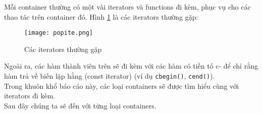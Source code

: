 Mỗi container thường có một vài iterators và functions đi kèm, phục vụ cho các thao tác trên container đó. Hình \ref{popite} là các iterators thường gặp:
\begin{figure}[H]
    \centering
    \texttt{[image: popite.png]}
    \caption{Các iterators thường gặp}
    \label{popite}
\end{figure}
Ngoài ra, các hàm thành viên trên sẽ đi kèm với các hàm có tiền tố c- để chỉ rằng hàm trả về biến lặp hằng (const iterator) (ví dụ \lstinline{cbegin()}, \lstinline{cend()}).\\
Trong khuôn khổ báo cáo này, các loại containers sẽ được tìm hiểu cùng với iterators đi kèm.\\
Sau đây chúng ta sẽ đến với từng loại containers.